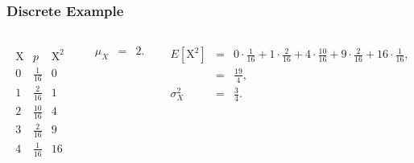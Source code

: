 \begin{frame}
  \frametitle{Discrete Example}


   \begin{columns}
     \begin{eqnarray*}
       \begin{array}{r|l|l}
         \mathrm{X} & p & \mathrm{X}^2 \\ \hline
          0 & \frac{1}{16} & 0  \\ [5pt]
          1 & \frac{2}{16} & 1 \\ [5pt]
          2 & \frac{10}{16}& 4 \\ [5pt]
          3 & \frac{2}{16} & 9 \\ [5pt]
          4 & \frac{1}{16} & 16
       \end{array}
     \end{eqnarray*}

       \begin{eqnarray*}
         \mu_X & = & 2.
       \end{eqnarray*}

     {
       \begin{eqnarray*}
         E\left[\mathrm{X}^2\right] & = & 0 \cdot \frac{1}{16} + 1 \cdot \frac{2}{16} + 4 \cdot \frac{10}{16} + 9 \cdot \frac{2}{16} + 16 \cdot \frac{1}{16}, \\
         & = & \frac{19}{4}, \\
         \sigma^2_X & = & \frac{3}{4}.
       \end{eqnarray*}
     }

   \end{columns}

  
\end{frame}


